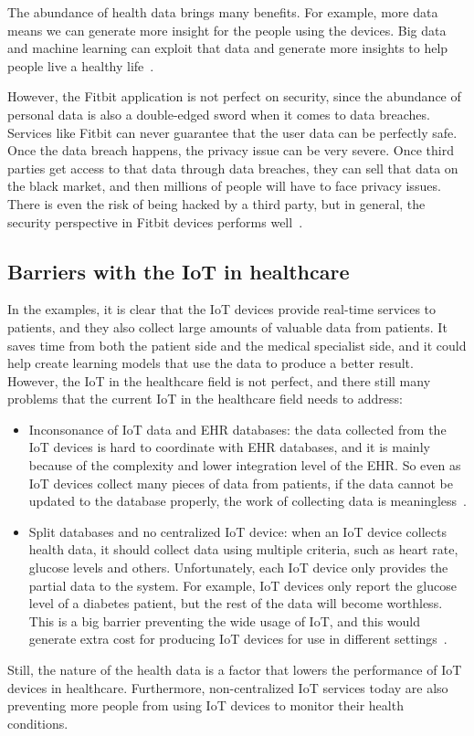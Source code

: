 The abundance of health data brings many benefits. For example, more data 
means we can generate more insight for the people using the devices. 
Big data and machine 
learning can exploit that data and generate more insights to help people 
live a healthy life~\cite{fitbit}.

However, the Fitbit application is not perfect on security, since the 
abundance of personal data is also a double-edged sword when it comes 
to data breaches. Services like Fitbit can never guarantee that the user data 
can be perfectly safe. Once the data breach happens, the privacy issue 
can be very severe. Once third parties get access to that data through 
data breaches, they can sell that data on the black market, and then millions 
of people will have to face privacy issues. There is even the 
risk of being hacked by a third party, but in general, the security 
perspective in Fitbit devices performs well~\cite{Cyr}.

\subsection{Barriers with the IoT in healthcare}
In the examples, it is clear that the IoT devices 
provide real-time services to 
patients, and they also collect large amounts of 
valuable data from patients. It 
saves time from both the patient side and the 
medical specialist side, and it 
could help create learning models that use the 
data to produce a better result. 
However, 
the IoT in the healthcare field is not perfect, 
and there still many problems 
that the current IoT in the healthcare field 
needs to address:
\begin{itemize}
	\item Inconsonance of IoT data and EHR databases: 
	the data collected 
	from the IoT devices is hard to coordinate with EHR 
	databases, and it is 
	mainly because of the complexity and lower 
	integration level of the 
	EHR. So even as IoT devices collect many pieces 
	of data from patients, 
	if the data 
	cannot be updated to the database properly, 
	the work of collecting data 
	is meaningless~\cite{iotb}.
	\item Split databases and no centralized IoT device: 
	when an IoT device 
	collects health data, it should collect data using multiple 
	criteria, such as 
	heart rate, glucose levels and others. 
	Unfortunately, each IoT device 
	only provides the partial data to the system. 
	For example, IoT devices 
	only report the glucose level of a diabetes patient, 
	but the rest of the 
	data will become worthless. 
	This is a big barrier preventing the wide
	usage of IoT, and this would generate extra 
	cost for producing IoT 
	devices for use in different settings~\cite{iotb}. 
\end{itemize}
Still, the nature of the health data is a factor 
that lowers the performance of 
IoT devices in healthcare. Furthermore, 
non-centralized IoT services today 
are also preventing more people from 
using IoT devices to monitor their health 
conditions.

